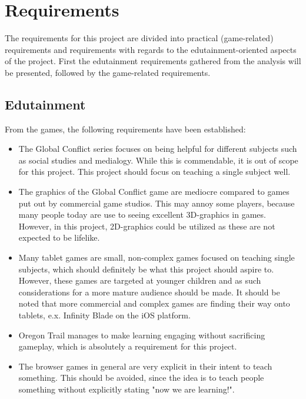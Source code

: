 \section{Requirements}
\label{sec:requirements}

The requirements for this project are divided into practical (game-related) requirements and requirements with regards to the edutainment-oriented 
aspects of the project. First the edutainment requirements gathered from the analysis will be presented, followed by the game-related requirements.

\subsection{Edutainment}

From the games, the following requirements have been established: 

\begin{itemize}
	\item The Global Conflict series focuses on being helpful for different subjects such as social studies and medialogy. While this is commendable, it 
	is out of scope for this project. This project should focus on teaching a single subject well.

	\item The graphics of the Global Conflict game are mediocre compared to games put out by commercial game studios. This may annoy some players, 
	because many people today are use to seeing excellent 3D-graphics in games. However, in this project, 2D-graphics could be utilized as these are not 
	expected to be lifelike.

	\item Many tablet games are small, non-complex games focused on teaching single subjects, which should definitely be what this project should aspire 
	to. However, these games are targeted at younger children and as such considerations for a more mature audience should be made. It should be noted 
	that more commercial and complex games are finding their way onto tablets, e.x. Infinity Blade on the iOS platform.

	\item Oregon Trail manages to make learning engaging without sacrificing gameplay, which is absolutely a requirement for this project.

	\item The browser games in general are very explicit in their intent to teach something. This should be avoided, since the idea is to teach people 
	something without explicitly stating "now we are learning!". 
\end{itemize}

